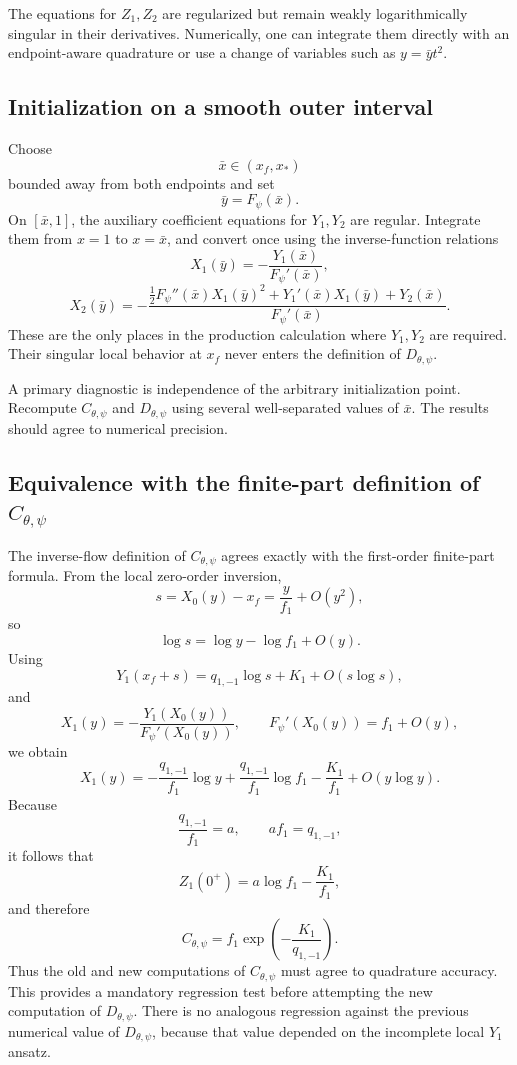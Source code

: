 \documentclass[11pt]{article}
\newcommand{\Fpsi}{F_\psi}
\newcommand{\xf}{x_f}
\newcommand{\xs}{x_*}
\begin{document}
The equations for \(Z_1,Z_2\) are regularized but remain weakly logarithmically singular in their derivatives.  Numerically, one can integrate them directly with an endpoint-aware quadrature or use a change of variables such as \(y=\bar y t^2\).

\subsection{Initialization on a smooth outer interval}
Choose
\[
\bar x\in(\xf,\xs)
\]
bounded away from both endpoints and set
\[
\bar y=\Fpsi(\bar x).
\]
On \([\bar x,1]\), the auxiliary coefficient equations for \(Y_1,Y_2\) are regular.  Integrate them from \(x=1\) to \(x=\bar x\), and convert once using the inverse-function relations
\[
\boxed{
X_1(\bar y)
=-\frac{Y_1(\bar x)}{\Fpsi'(\bar x)}},
\]
\[
\boxed{
X_2(\bar y)
=-\frac{
\frac12\Fpsi''(\bar x)X_1(\bar y)^2
+Y_1'(\bar x)X_1(\bar y)
+Y_2(\bar x)}
{\Fpsi'(\bar x)}}.
\]
These are the only places in the production calculation where \(Y_1,Y_2\) are required.  Their singular local behavior at \(\xf\) never enters the definition of \(D_{\theta,\psi}\).

A primary diagnostic is independence of the arbitrary initialization point.  Recompute \(C_{\theta,\psi}\) and \(D_{\theta,\psi}\) using several well-separated values of \(\bar x\).  The results should agree to numerical precision.

\subsection{Equivalence with the finite-part definition of \texorpdfstring{\(C_{\theta,\psi}\)}{C}}
The inverse-flow definition of \(C_{\theta,\psi}\) agrees exactly with the first-order finite-part formula.  From the local zero-order inversion,
\[
s=X_0(y)-\xf=\frac{y}{f_1}+O(y^2),
\]
so
\[
\log s=\log y-\log f_1+O(y).
\]
Using
\[
Y_1(\xf+s)=q_{1,-1}\log s+K_1+O(s\log s),
\]
and
\[
X_1(y)=-\frac{Y_1(X_0(y))}{\Fpsi'(X_0(y))},
\qquad
\Fpsi'(X_0(y))=f_1+O(y),
\]
we obtain
\[
X_1(y)
=-\frac{q_{1,-1}}{f_1}\log y
+\frac{q_{1,-1}}{f_1}\log f_1
-\frac{K_1}{f_1}
+O(y\log y).
\]
Because
\[
\frac{q_{1,-1}}{f_1}=a,
\qquad
af_1=q_{1,-1},
\]
it follows that
\[
\boxed{
Z_1(0^+)=a\log f_1-\frac{K_1}{f_1}},
\]
and therefore
\[
\boxed{
C_{\theta,\psi}
=f_1\exp\left(-\frac{K_1}{q_{1,-1}}\right)}.
\]
Thus the old and new computations of \(C_{\theta,\psi}\) must agree to quadrature accuracy.  This provides a mandatory regression test before attempting the new computation of \(D_{\theta,\psi}\).  There is no analogous regression against the previous numerical value of \(D_{\theta,\psi}\), because that value depended on the incomplete local \(Y_1\) ansatz.
\end{document}
